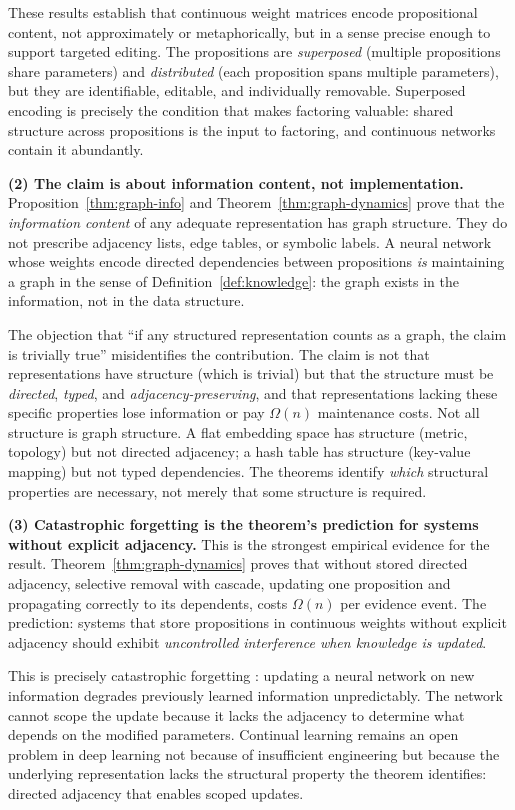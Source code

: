 \documentclass[11pt]{article}
\theoremstyle{definition}
\begin{document}
These results establish that continuous weight matrices encode
propositional content, not approximately or metaphorically, but in a
sense precise enough to support targeted editing. The propositions are
\emph{superposed} (multiple propositions share parameters) and
\emph{distributed} (each proposition spans multiple parameters), but
they are identifiable, editable, and individually removable. Superposed
encoding is precisely the condition that makes factoring valuable: shared
structure across propositions is the input to factoring, and continuous
networks contain it abundantly.

\textbf{(2) The claim is about information content, not
implementation.}
Proposition~\ref{thm:graph-info} and Theorem~\ref{thm:graph-dynamics} prove that
the \emph{information content} of any adequate representation has graph
structure. They do not prescribe adjacency lists, edge tables, or
symbolic labels. A neural network whose weights encode directed
dependencies between propositions \emph{is} maintaining a graph in the
sense of Definition~\ref{def:knowledge}: the graph exists in the
information, not in the data structure.

The objection that ``if any structured representation counts as a
graph, the claim is trivially true'' misidentifies the contribution.
The claim is not that representations have structure (which is trivial)
but that the structure must be \emph{directed}, \emph{typed}, and
\emph{adjacency-preserving}, and that representations lacking these
specific properties lose information or pay $\Omega(n)$ maintenance
costs. Not all structure is graph structure. A flat embedding space has
structure (metric, topology) but not directed adjacency; a hash table
has structure (key-value mapping) but not typed dependencies. The
theorems identify \emph{which} structural properties are necessary, not
merely that some structure is required.

\textbf{(3) Catastrophic forgetting is the theorem's prediction for
systems without explicit adjacency.}
This is the strongest empirical evidence for the result.
Theorem~\ref{thm:graph-dynamics} proves that without stored directed
adjacency, selective removal with cascade, updating one proposition
and propagating correctly to its dependents, costs $\Omega(n)$ per
evidence event. The prediction: systems that store propositions in
continuous weights without explicit adjacency should exhibit
\emph{uncontrolled interference when knowledge is updated}.

This is precisely catastrophic forgetting
\cite{McCloskey1989,Kirkpatrick2017}: updating a neural network on new
information degrades previously learned information unpredictably.
The network cannot scope the update because it lacks the adjacency
to determine what depends on the modified parameters. Continual
learning remains an open problem in deep learning not because of
insufficient engineering but because the underlying representation
lacks the structural property the theorem identifies: directed
adjacency that enables scoped updates.
\end{document}
